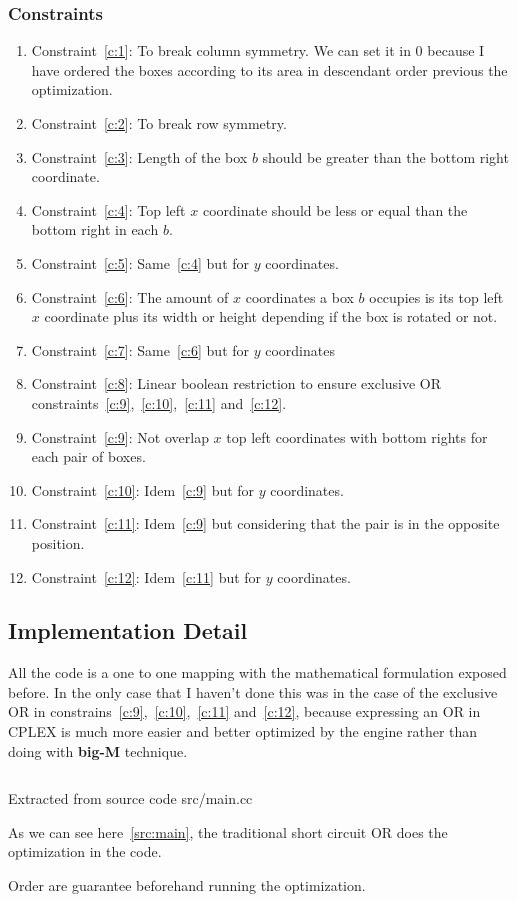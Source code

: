 \documentclass[12pt, a4paper]{article}
\begin{document}
\subsubsection{Constraints}
\begin{enumerate}

  \item Constraint~\ref{c:1}: To break column symmetry. We can set it in $0$ because I have ordered the boxes according to its area in descendant order previous the optimization.
  \item Constraint~\ref{c:2}: To break row symmetry.
  \item Constraint~\ref{c:3}: Length of the box $b$ should be greater than the bottom right coordinate.
  \item Constraint~\ref{c:4}: Top left $x$ coordinate should be less or equal than the bottom right in each $b$.
  \item Constraint~\ref{c:5}: Same~\ref{c:4} but for $y$ coordinates.
  \item Constraint~\ref{c:6}: The amount of $x$ coordinates a box $b$ occupies is its top left $x$ coordinate plus its width or height depending if the box is rotated or not.
  \item Constraint~\ref{c:7}: Same~\ref{c:6} but for $y$ coordinates
  \item Constraint~\ref{c:8}: Linear boolean restriction to ensure exclusive OR constraints~\ref{c:9},~\ref{c:10},~\ref{c:11} and~\ref{c:12}.
  \item Constraint~\ref{c:9}: Not overlap $x$ top left coordinates with bottom rights for each pair of boxes.
  \item Constraint~\ref{c:10}: Idem~\ref{c:9} but for $y$ coordinates.
  \item Constraint~\ref{c:11}: Idem~\ref{c:9} but considering that the pair is in the opposite position.
  \item Constraint~\ref{c:12}: Idem~\ref{c:11} but for $y$ coordinates.
\end{enumerate}

\subsection{Implementation Detail}
All the code is a one to one mapping with the mathematical formulation exposed before. In the only case that I haven't done this was in the case of the exclusive OR in constrains~\ref{c:9},~\ref{c:10},~\ref{c:11} and~\ref{c:12}, because expressing an OR in CPLEX is much more easier and better optimized by the engine rather than doing with \textbf{big-M} technique.

\begin{listing}[H]
  \inputminted[firstline=68, lastline=75, breaklines]{cpp}{../src/main.cc}
  \caption{Extracted from source code src/main.cc}
  \label{src:main}
\end{listing}

As we can see here~\ref{src:main}, the traditional short circuit OR does the optimization in the code.

Order are guarantee beforehand running the optimization.
\end{document}
